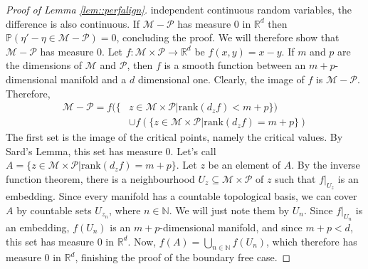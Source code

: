 \documentclass{article} %
\newcommand\NN{\mathbb{N}}
\newcommand\manP{\mathcal{P}}
\newcommand\manM{\mathcal{M}}
\newcommand\PP{\mathbb{P}}
\newcommand\RR{\mathbb{R}}
\theoremstyle{definition}
\begin{document}
\begin{appendices}
\begin{proof}[Proof of Lemma \autoref{lem::perfalign}]
independent continuous random variables, the difference is also continuous. If $\manM
- \manP$ has measure 0 in $\RR^d$ then $\PP(\eta' - \eta \in \manM - \manP) = 0$,
concluding the proof. We will therefore show that $\manM - \manP$ has measure 0.
Let $f: \manM \times \manP \rightarrow \RR^d$ be $f(x, y) = x - y$. If $m$ and $p$
are the dimensions of $\manM$ and $\manP$, then $f$ is a smooth function between
an $m+p$-dimensional manifold and a $d$ dimensional one. Clearly, the image
of $f$ is $\manM - \manP$. Therefore,
\begin{align*}
\manM - \manP = f(\{&z \in \manM \times \manP | \text{rank}(d_z f) < m + p\}) \\
  &\cup f(\{z \in \manM \times \manP | \text{rank}(d_z f) = m + p\})
\end{align*}
The first set is the image of the critical points, namely the critical values. By
Sard's Lemma, this set has measure 0.
Let's call $A = \{z \in \manM \times \manP | \text{rank}(d_z f) = m + p \}$.
Let $z$ be an element of $A$. By the inverse function theorem, there is a neighbourhood
$U_z \subseteq \manM \times \manP$ of $z$ such that $f|_{U_z}$ is an embedding.
Since every manifold has a countable topological basis, we can cover $A$ by
countable sets $U_{z_n}$, where $n \in \NN$. We will just note them by $U_n$.
Since $f|_{U_n}$ is an embedding, $f(U_n)$ is an $m+p$-dimensional manifold,
and since $m + p < d$, this set has measure 0 in $\RR^d$. Now, $f(A) = 
\bigcup_{n \in \NN} f(U_n)$, which therefore has measure 0 in $\RR^d$, finishing the
proof of the boundary free case.


\end{proof}
\end{appendices}
\end{document}
